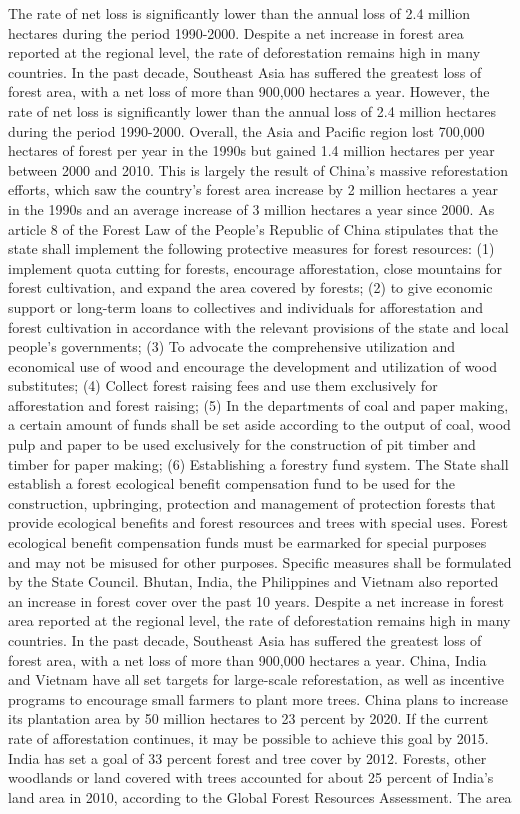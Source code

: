 \documentclass{book}\usepackage{knitr}
\begin{document}
\begin{knitrout}
\begin{kframe}
	The rate of net loss is significantly lower than the annual loss of 2.4 million hectares during the period 1990-2000. Despite a net increase in forest area reported at the regional level, the rate of deforestation remains high in many countries. In the past decade, Southeast Asia has suffered the greatest loss of forest area, with a net loss of more than 900,000 hectares a year. However, the rate of net loss is significantly lower than the annual loss of 2.4 million hectares during the period 1990-2000. Overall, the Asia and Pacific region lost 700,000 hectares of forest per year in the 1990s but gained 1.4 million hectares per year between 2000 and 2010. This is largely the result of China's massive reforestation efforts, which saw the country's forest area increase by 2 million hectares a year in the 1990s and an average increase of 3 million hectares a year since 2000. As article 8 of the Forest Law of the People's Republic of China stipulates that the state shall implement the following protective measures for forest resources: (1) implement quota cutting for forests, encourage afforestation, close mountains for forest cultivation, and expand the area covered by forests; (2) to give economic support or long-term loans to collectives and individuals for afforestation and forest cultivation in accordance with the relevant provisions of the state and local people's governments; (3) To advocate the comprehensive utilization and economical use of wood and encourage the development and utilization of wood substitutes; (4) Collect forest raising fees and use them exclusively for afforestation and forest raising; (5) In the departments of coal and paper making, a certain amount of funds shall be set aside according to the output of coal, wood pulp and paper to be used exclusively for the construction of pit timber and timber for paper making; (6) Establishing a forestry fund system. The State shall establish a forest ecological benefit compensation fund to be used for the construction, upbringing, protection and management of protection forests that provide ecological benefits and forest resources and trees with special uses. Forest ecological benefit compensation funds must be earmarked for special purposes and may not be misused for other purposes. Specific measures shall be formulated by the State Council. Bhutan, India, the Philippines and Vietnam also reported an increase in forest cover over the past 10 years. Despite a net increase in forest area reported at the regional level, the rate of deforestation remains high in many countries. In the past decade, Southeast Asia has suffered the greatest loss of forest area, with a net loss of more than 900,000 hectares a year. China, India and Vietnam have all set targets for large-scale reforestation, as well as incentive programs to encourage small farmers to plant more trees. China plans to increase its plantation area by 50 million hectares to 23 percent by 2020. If the current rate of afforestation continues, it may be possible to achieve this goal by 2015. India has set a goal of 33 percent forest and tree cover by 2012. Forests, other woodlands or land covered with trees accounted for about 25 percent of India's land area in 2010, according to the Global Forest Resources Assessment. The area 
\end{kframe}
\end{knitrout}
\end{document}
